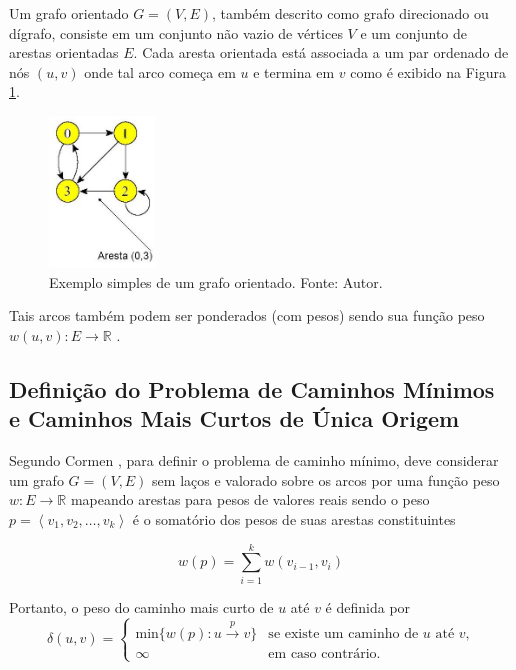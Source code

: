 \documentclass[12pt]{article}
\begin{document}
Um grafo orientado $G=(V,E)$, também descrito como grafo direcionado ou dígrafo, consiste em um conjunto não vazio de vértices $V$ e um conjunto de arestas orientadas $E$. Cada aresta orientada está associada a um par ordenado de nós $(u, v)$ onde tal arco começa em $u$ e termina em $v$ como é exibido na Figura \ref{fig:orientado}.

\begin{figure}[H]
  \centering
    \includegraphics[width=0.25\textwidth]{img/ponderado.jpg}
  \caption{Exemplo simples de um grafo orientado. Fonte: Autor.}
  \label{fig:orientado}
\end{figure}

Tais arcos também podem ser ponderados (com pesos) sendo sua função peso $w(u, v) : E \rightarrow \mathbb{R}$ \cite{netto2003grafos}.


    
\subsection{Definição do Problema de Caminhos Mínimos e Caminhos Mais Curtos de Única Origem} \label{sec:1todos}

	Segundo Cormen \cite{cormen2002algoritmos}, para definir o problema de caminho mínimo, deve considerar um grafo $G = (V, E)$ sem laços e valorado sobre os arcos por uma função peso $w : E \rightarrow \mathbb{R}$ mapeando arestas para pesos de valores reais sendo o peso $p = \left \langle v_{1}, v_{2}, \ldots, v_{k}  \right \rangle$ é o somatório dos pesos de suas arestas constituintes 
    
    $$w(p) = \sum_{i=1}^{k} w(v_{i-1}, v_{i})$$
   
Portanto, o peso do caminho mais curto de $u$ até $v$ é definida por 
$$
	\delta(u, v) = 
	\begin{cases}
		\text{min}\{w(p):u\xrightarrow{p} v\} & \text{se existe um caminho de } u \text{ até } v\text{,}\\
		\infty & \text{em caso contrário.}
	\end{cases}
$$
\end{document}
